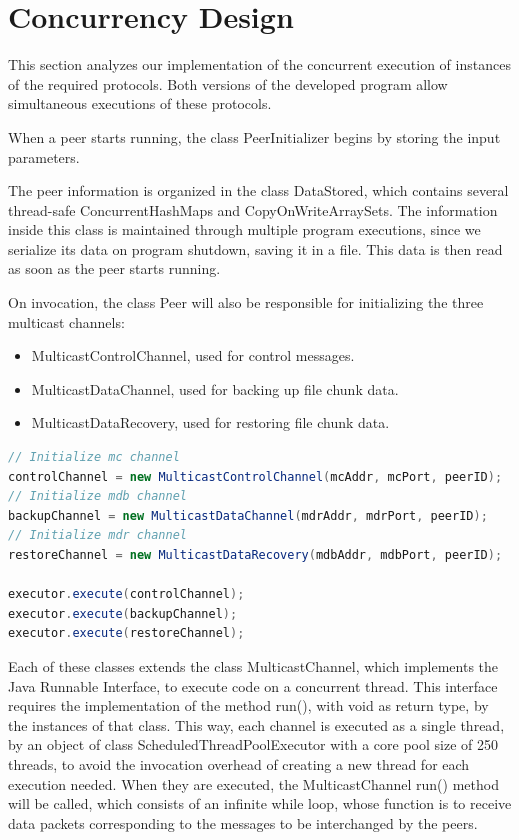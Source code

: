 \documentclass[11pt]{article}
\begin{document}
\section{Concurrency Design}

This section analyzes our implementation of the concurrent execution of instances of the required protocols.
Both versions of the developed program allow simultaneous executions of these protocols.

When a peer starts running, the class PeerInitializer begins by storing the input parameters.


The peer information is organized in the class DataStored, which contains several thread-safe ConcurrentHashMaps and CopyOnWriteArraySets. The information inside this class is maintained through multiple program executions, since we serialize its data on program shutdown, saving it in a file. This data is then read as soon as the peer starts running.

On invocation, the class Peer will also be responsible for initializing the three multicast channels:
\begin{itemize}
	\item MulticastControlChannel, used for control messages.
	\item MulticastDataChannel, used for backing up file chunk data.
 	\item MulticastDataRecovery, used for restoring file chunk data.
\end{itemize}

\begin{lstlisting}[language=java]
// Initialize mc channel
controlChannel = new MulticastControlChannel(mcAddr, mcPort, peerID);
// Initialize mdb channel
backupChannel = new MulticastDataChannel(mdrAddr, mdrPort, peerID);
// Initialize mdr channel
restoreChannel = new MulticastDataRecovery(mdbAddr, mdbPort, peerID);

executor.execute(controlChannel);
executor.execute(backupChannel);
executor.execute(restoreChannel);
\end{lstlisting}


Each of these classes extends the class MulticastChannel, which implements the Java Runnable Interface, to execute code on a concurrent thread.
This interface requires the implementation of the method run(), with void as return type, by the instances of that class.
This way, each channel is executed as a single thread, by an object of class ScheduledThreadPoolExecutor with a core pool size of 250 threads, to avoid the invocation overhead of creating a new thread for each execution needed.
When they are executed, the MulticastChannel run() method will be called, which consists of an infinite while loop, whose function is to receive data packets corresponding to the messages to be interchanged by the peers.
\end{document}
